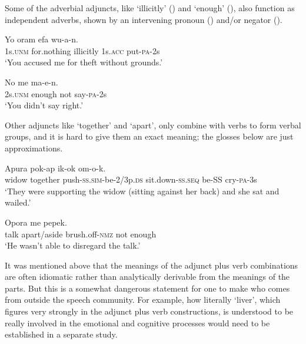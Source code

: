 Some of the adverbial adjuncts, like  `illicitly' () and  `enough' (), also function as independent adverbs, shown by an intervening pronoun () and/or negator ().

\ea%
\label{ex:x458}
\gll Yo oram  efa wu-a-n. \\
1s.\textsc{unm} for.nothing illicitly 1s.\textsc{acc} put-\textsc{pa}-2s\\
\glt`You accused me for theft without grounds.'
\z

\ea%
\label{ex:x459}
\gll No  me ma-e-n. \\
2s.\textsc{unm} enough not say-\textsc{pa}-2s\\
\glt`You didn't say right.'
\z

Other adjuncts like  `together' and  `apart', only combine with verbs to form verbal groups, and it is hard to give them an exact meaning; the glosses below are just approximations.

\ea%
\label{ex:x460}
\gll Apura   pok-ap ik-ok om-o-k.\\
widow together push-\textsc{ss}.\textsc{sim}-be-2/3p.\textsc{ds} sit.down-\textsc{ss}.\textsc{seq} be-SS cry-\textsc{pa}-3s\\
\glt`They were supporting the widow (sitting against her back) and she sat and wailed.'
\z

\ea%
\label{ex:x461}
\gll Opora   me pepek. \\
talk apart/aside brush.off-\textsc{nmz} not enough \\
\glt`He wasn't able to disregard the talk.'
\z

It was mentioned above that the meanings of the adjunct plus verb combinations are often idiomatic rather than analytically derivable from the meanings of the parts. But this is a somewhat dangerous statement for one to make who comes from outside the speech community. For example, how literally  `liver', which figures very strongly in the adjunct plus verb constructions, is understood to be really involved in the emotional and cognitive processes would need to be established in a separate study.

